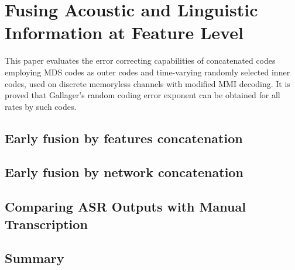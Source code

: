 \chapter{Fusing Acoustic and Linguistic Information at Feature Level}
This paper evaluates the error 
correcting capabilities of concatenated codes 
employing MDS codes as outer codes and
time-varying randomly selected inner codes,
used on discrete memoryless channels with modified MMI
decoding. It is proved that 
Gallager's random coding error exponent
can be obtained for all rates by such codes.
\section{Early fusion by features concatenation}
\section{Early fusion by network concatenation}
\section{Comparing ASR Outputs with Manual Transcription}
\section{Summary}

